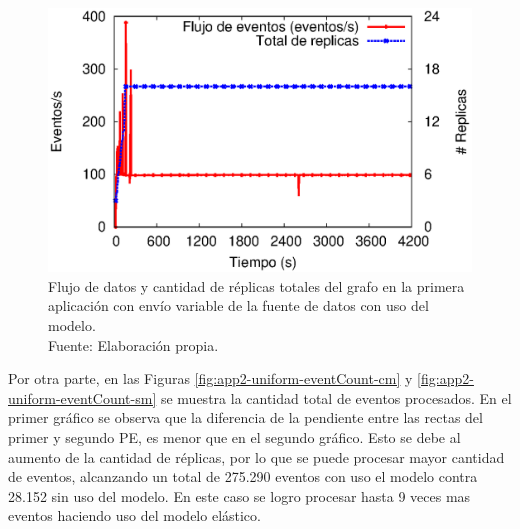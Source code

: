 \begin{figure}[!ht]
	\centering
	\captionsetup{justification=centering}
	\includegraphics[scale=0.7]{images/exp/app2/uniform/cm/processSystem.eps}
    \caption[Flujo de datos y cantidad de r\'eplicas totales del grafo en la primera aplicaci\'on con env\'io variable de la fuente de datos con uso del modelo.]{Flujo de datos y cantidad de r\'eplicas totales del grafo en la primera aplicaci\'on con env\'io variable de la fuente de datos con uso del modelo.\\Fuente: Elaboraci\'on propia.}
	\label{fig:app2-uniform-processSystem-cm}
\end{figure}



Por otra parte, en las Figuras \ref{fig:app2-uniform-eventCount-cm} y \ref{fig:app2-uniform-eventCount-sm} se muestra la cantidad total de eventos procesados. En el primer gr\'afico se observa que la diferencia de la pendiente entre las rectas del primer y segundo PE, es menor que en el segundo gr\'afico. Esto se debe al aumento de la cantidad de r\'eplicas, por lo que se puede procesar mayor cantidad de eventos, alcanzando un total de 275.290 eventos con uso el modelo contra 28.152 sin uso del modelo. En este caso se logro procesar hasta 9 veces mas eventos haciendo uso del modelo el\'astico.

